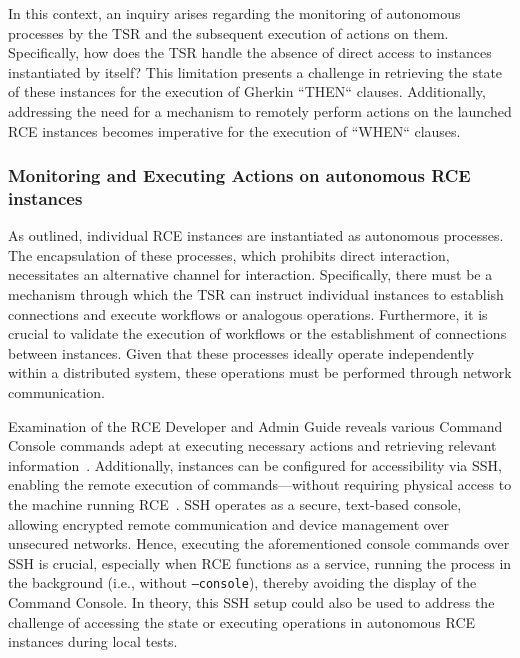 In this context, an inquiry arises regarding the monitoring of autonomous processes by the \ac{TSR} and the subsequent execution of actions on them. Specifically, how does the \ac{TSR} handle the absence of direct access to instances instantiated by itself? This limitation presents a challenge in retrieving the state of these instances for the execution of Gherkin ``THEN`` clauses. Additionally, addressing the need for a mechanism to remotely perform actions on the launched RCE instances becomes imperative for the execution of ``WHEN`` clauses.


\subsubsection{Monitoring and Executing Actions on autonomous RCE instances}
As outlined, individual RCE instances are instantiated as autonomous processes. The encapsulation of these processes, which prohibits direct interaction, necessitates an alternative channel for interaction. Specifically, there must be a mechanism through which the \ac{TSR} can instruct individual instances to establish connections and execute workflows or analogous operations. Furthermore, it is crucial to validate the execution of workflows or the establishment of connections between instances. Given that these processes ideally operate independently within a distributed system, these operations must be performed through network communication.

Examination of the \ac{RCE} Developer and Admin Guide reveals various Command Console commands adept at executing necessary actions and retrieving relevant information~\cite{rceDevGuide10x}. Additionally, instances can be configured for accessibility via \ac{SSH}, enabling the remote execution of commands—without requiring physical access to the machine running RCE~\cite{rceDevGuide10x}. \ac{SSH} operates as a secure, text-based console, allowing encrypted remote communication and device management over unsecured networks. Hence, executing the aforementioned console commands over \ac{SSH} is crucial, especially when \ac{RCE} functions as a service, running the process in the background (i.e., without \texttt{--console}), thereby avoiding the display of the Command Console. In theory, this \ac{SSH} setup could also be used to address the challenge of accessing the state or executing operations in autonomous \ac{RCE} instances during local tests.

